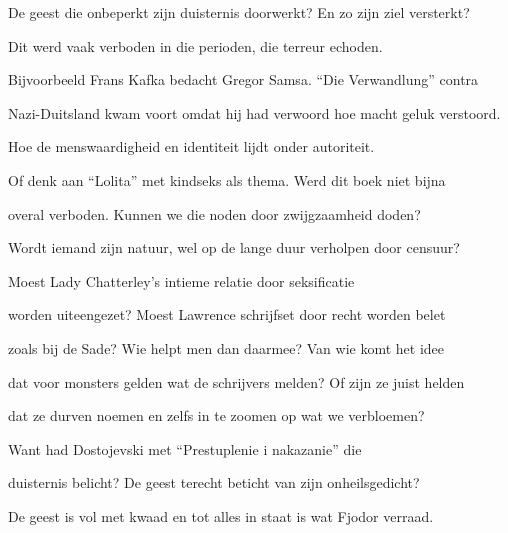 De geest die onbeperkt
zijn duisternis doorwerkt?
En zo zijn ziel versterkt?

Dit werd vaak verboden
in die perioden,
die terreur echoden.

Bijvoorbeeld Frans Kafka
bedacht Gregor Samsa.
“Die Verwandlung” contra

Nazi-Duitsland kwam voort
omdat hij had verwoord
hoe macht geluk verstoord.

Hoe de menswaardigheid
en identiteit lijdt
onder autoriteit.

Of denk aan “Lolita”
met kindseks als thema.
Werd dit boek niet bijna

overal verboden.
Kunnen we die noden
door zwijgzaamheid doden?

Wordt iemand zijn natuur,
wel op de lange duur
verholpen door censuur?

Moest Lady Chatterley’s
intieme relatie
door seksificatie

worden uiteengezet?
Moest Lawrence schrijfset
door recht worden belet

zoals bij de Sade?
Wie helpt men dan daarmee?
Van wie komt het idee

dat voor monsters gelden
wat de schrijvers melden?
Of zijn ze juist helden

dat ze durven noemen
en zelfs in te zoomen
op wat we verbloemen?

Want had Dostojevski
met “Prestuplenie
i nakazanie” die

duisternis belicht?
De geest terecht beticht
van zijn onheilsgedicht?

De geest is vol met kwaad
en tot alles in staat
is wat Fjodor verraad.
